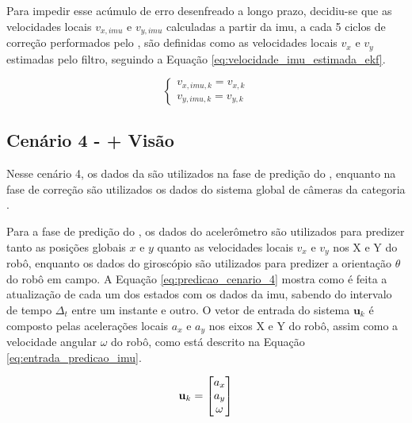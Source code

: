 \documentclass[acronym, symbols, table]{fei}
\begin{document}
			Para impedir esse acúmulo de erro desenfreado a longo prazo, decidiu-se que as velocidades locais $v_{x,imu}$ e $v_{y,imu}$ calculadas a partir da \acrshort{imu}, a cada 5 ciclos de correção performados pelo , são definidas como as velocidades locais $v_{x}$ e $v_{y}$ estimadas pelo filtro, seguindo a Equação \eqref{eq:velocidade_imu_estimada_ekf}.
			
			\begin{equation}\label{eq:velocidade_imu_estimada_ekf}
				\begin{cases}
					v_{x,imu,k} = v_{x,k} \\
					v_{y,imu,k} = v_{y,k}
				\end{cases}
			\end{equation}
		
		\subsection{Cenário 4 -  + Visão} \label{sec:implementacao_cenario_4}
		
			Nesse cenário 4, os dados da  são utilizados na fase de predição do , enquanto na fase de correção são utilizados os dados do sistema global de câmeras da categoria .
			
			Para a fase de predição do , os dados do acelerômetro são utilizados para predizer tanto as posições globais $x$ e $y$ quanto as velocidades locais $v_{x}$ e $v_{y}$ nos X e Y do robô, enquanto os dados do giroscópio são utilizados para predizer a orientação $\theta$ do robô em campo. A Equação \eqref{eq:predicao_cenario_4} mostra como é feita a atualização de cada um dos estados com os dados da \acrshort{imu}, sabendo do intervalo de tempo $\Delta_t$ entre um instante e outro. O vetor de entrada do sistema $\textbf{u}_k$ é composto pelas acelerações locais $a_{x}$ e $a_{y}$ nos eixos X e Y do robô, assim como a velocidade angular $\omega$ do robô, como está descrito na Equação \eqref{eq:entrada_predicao_imu}.
			
			\begin{equation}\label{eq:entrada_predicao_imu}
				\text{\textbf{u}}_k =
				\begin{bmatrix}
					a_{x} \\
					a_{y} \\
					\omega
				\end{bmatrix}
			\end{equation}
			
\end{document}
